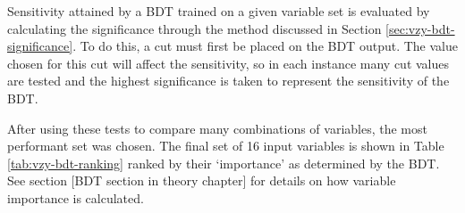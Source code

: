 Sensitivity attained by a \ac{BDT} trained on a given variable set is evaluated
by calculating the significance through the method discussed in Section
\ref{sec:vzy-bdt-significance}. To do this, a cut must first be placed on the
\ac{BDT} output. The value chosen for this cut will affect the sensitivity, so
in each instance many cut values are tested and the highest significance is
taken to represent the sensitivity of the \ac{BDT}.

After using these tests to compare many combinations of variables, the most
performant set was chosen.  The final set of 16 input variables is shown in
Table \ref{tab:vzy-bdt-ranking} ranked by their `importance' as determined by
the \ac{BDT}. See section [BDT section in theory chapter] for details on how
variable importance is calculated.


